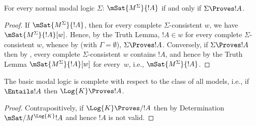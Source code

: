 \documentclass[../../../include/open-logic-section]{subfiles}
\begin{document}


\begin{thm}[Determination]
   For every normal modal logic $\Sigma$: $\mSat{M^\Sigma}{!A}$ if and
   only if $\Sigma \Proves !A$.
\end{thm}

\begin{proof}
  If $\mSat{M^\Sigma}{!A}$, then for every complete
  $\Sigma$-consistent $w$, we have $\mSat{M^\Sigma}{!A}[w]$. Hence, by
  the Truth Lemma, $!A \in w$ for every complete $\Sigma$-consistent
  $w$, whence by  (with
  $\Gamma = \emptyset$), $\Sigma \Proves !A$. Conversely, if $\Sigma
  \Proves !A$ then by
  ,
  every complete $\Sigma$-consistent $w$ contains $!A$, and hence by
  the Truth Lemma $\mSat{M^\Sigma}{!A}[w]$ for every~$w$, i.e.,
  $\mSat{M^\Sigma}{!A}$.
\end{proof}

\begin{cor}
  The basic modal logic  is complete with respect to the
  class of all models, i.e., if $\Entails !A$ then $\Log{K}
  \Proves !A$.
\end{cor}

\begin{proof}
  Contrapositively, if $\Log{K} \Proves/ !A$ then by Determination
  $\mSat/{M^\Log{K}}{!A}$ and hence $!A$ is not valid.
\end{proof}
\end{document}
